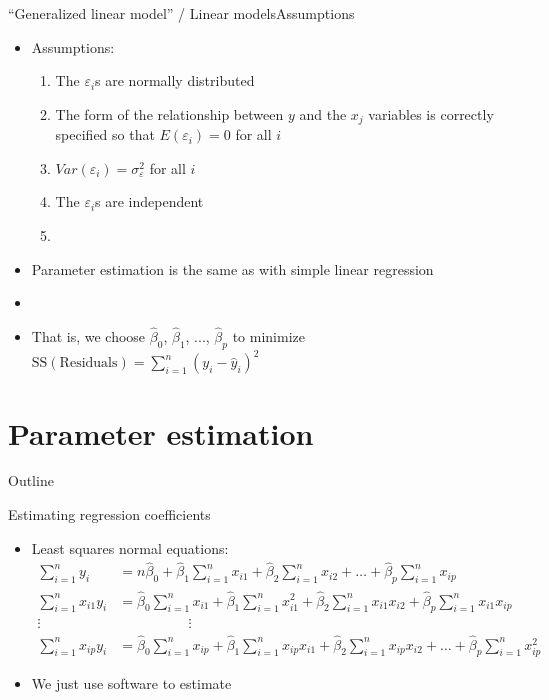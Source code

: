 \documentclass[xcolor=dvipsnames]{beamer}
\begin{document}
\begin{frame}{``Generalized linear model'' / Linear models}{Assumptions}
\begin{itemize}
	\item Assumptions:
	\begin{enumerate}
		\item The $\varepsilon_i$s are normally distributed 
		\item The form of the relationship between $y$ and the $x_j$ variables is correctly specified so that $E(\varepsilon_i) = 0$ for all $i$
		\item $Var(\varepsilon_i) = \sigma_{\varepsilon}^2$ for all $i$
		\item The $\varepsilon_i$s are independent
		\item[]
	\end{enumerate}	
	\item Parameter estimation is the same as with simple linear regression
	\item[]
	\item That is, we choose $\hat{\beta}_0$, $\hat{\beta}_1$, ..., $\hat{\beta}_p$ to minimize $\text{SS}(\text{Residuals}) = \sum_{i=1}^n (y_i -\hat{y}_i)^2$
\end{itemize}
\end{frame}

\section{Parameter estimation}
\begin{frame}{Outline}
	\tableofcontents[currentsection,subsectionstyle=show/shaded/hide]
\end{frame}

\begin{frame}{Estimating regression coefficients}
	\begin{itemize}
		\item Least squares normal equations:
		\begin{align*}
		\sum_{i=1}^n y_i &= n \hat{\beta}_0 + \hat{\beta}_1 \sum_{i=1}^n x_{i1} +  \hat{\beta}_2 \sum_{i=1}^n x_{i2} + \hdots + \hat{\beta}_p \sum_{i=1}^n x_{ip} \\
		\sum_{i=1}^n x_{i1} y_i &= \hat{\beta}_0 \sum_{i=1}^n x_{i1} + \hat{\beta}_1 \sum_{i=1}^n x^2_{i1} + \hat{\beta}_2 \sum_{i=1}^n x_{i1} x_{i2} + \hat{\beta}_p \sum_{i=1}^n x_{i1} x_{ip} \\
		\vdots & \quad \quad \quad \quad \quad \vdots \\
		\sum_{i=1}^n x_{ip} y_i &=  \hat{\beta}_0 \sum_{i=1}^n x_{ip} + \hat{\beta}_1 \sum_{i=1}^n x_{ip} x_{i1} + \hat{\beta}_2 \sum_{i=1}^n x_{ip} x_{i2} + \hdots + \hat{\beta}_p \sum_{i=1}^n x^2_{ip} 
		\end{align*}
		\item We just use software to estimate
	\end{itemize}
\end{frame}
\end{document}
